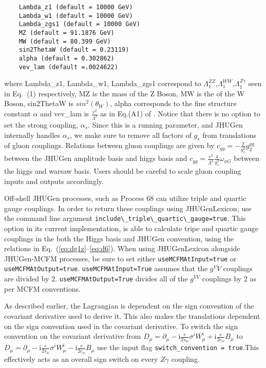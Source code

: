 \documentclass[aps,superscriptaddress,nofootinbib]{revtex4}
\begin{document}
\begin{verbatim}
    Lambda_z1 (default = 10000 GeV)
    Lambda_w1 (default = 10000 GeV)
    Lambda_zgs1 (default = 10000 GeV)
    MZ (default = 91.1876 GeV)
    MW (default = 80.399 GeV)
    sin2ThetaW (default = 0.23119)
    alpha (default = 0.302862)
    vev_lam (default =.0024622)
\end{verbatim}
where Lambda\_z1, Lambda\_w1, Lambda\_zgs1 correspond to $\Lambda_1^{ZZ}$,$\Lambda_1^{WW}$,$\Lambda_1^{Z\gamma}$ 
seen in Eq.~(1) respectively, MZ is the mass of the Z Boson, MW is the of the W Boson, sin2ThetaW is $sin^2(\theta_W)$, alpha corresponds to the fine structure constant $\alpha$ and vev\_lam is $\frac{v^2}{\Lambda^2}$ as in Eq.(A1) of \cite{Gritsan:2020pib}. Notice that there is no option to set the strong coupling, $\alpha_s$. Since this is a running parameter, and JHUGen internally handles $\alpha_s$, we make sure to remove all factors of $g_s$ from translations of gluon couplings. Relations between gluon couplings are given by $c_{gg}=-\frac{2}{g_s^2}g_2^{gg}$ between the JHUGen amplitude basis and higgs basis and $c_{gg}=\frac{v^2}{\Lambda^2}\frac{4}{g_s^2} \omega_{\phi G}$ between the higgs and warsaw basis. Users should be careful to scale gluon coupling inputs and outputs accordingly. 


Off-shell JHUGen processes, such as Process 68 can utilize triple and quartic gauge couplings. In order to return these couplings 
using JHUGenLexicon, use the command line argument \verb|include\_triple\_quartic\_gauge=true|. This option in its current implementation, 
is able to calculate tripe and quartic gauge couplings in the both the Higgs basis and JHUGen convention, using the relations in 
Eq.~(\ref{eq:dg1z}--\ref{eq:d6}). When using JHUGenLexicon alongside JHUGen-MCFM processes, be sure to set either 
\verb|useMCFMAtInput=true| or \verb|useMCFMAtOutput=true|. \verb|useMCFMAtInput=True| assumes that the $g^VV$ couplings are divided by 2. 
\verb|useMCFMAtOutput=True| divides all of the $g^{VV}$ couplings by 2 as per MCFM conventions.

As described earlier, the Lagrangian is dependent on the sign convention of the covariant derivative used to derive it. This also makes the translations dependent on the sign convention used in the covariant derivative. To switch the sign convention on the covariant derivative from $D_\mu = \partial_\mu -\mathrm{i} \frac{e}{2 s_w} \sigma^i W_\mu^i + \mathrm{i} \frac{e}{2 c_w} B_\mu$ to $D_\mu = \partial_\mu -\mathrm{i} \frac{e}{2 s_w} \sigma^i W_\mu^i - \mathrm{i} \frac{e}{2 c_w} B_\mu$ use the input flag \verb|switch_convention = true|.This effectively acts as an overall sign switch on every $Z\gamma$ coupling.
\end{document}
